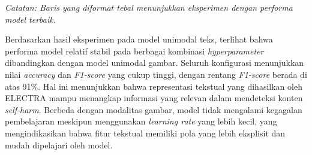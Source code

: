 \begin{table}[H]
    \centering
    \caption{Hasil Eksperimen Model unimodal Teks}
    \label{table:4.teks_eksperimenteks}
    \scriptsize
    \setlength{\tabcolsep}{2pt} 
    \renewcommand{\arraystretch}{1.1}
    \smallskip
    \begin{flushleft}
    \footnotesize \textit{Catatan: Baris yang diformat tebal menunjukkan eksperimen dengan performa model terbaik.}
    \end{flushleft}
\end{table}


Berdasarkan hasil eksperimen pada model unimodal teks, terlihat bahwa performa model relatif stabil pada berbagai kombinasi \textit{hyperparameter} dibandingkan dengan model unimodal gambar. Seluruh konfigurasi menunjukkan nilai \textit{accuracy} dan \textit{F1-score} yang cukup tinggi, dengan rentang \textit{F1-score} berada di atas 91\%. Hal ini menunjukkan bahwa representasi tekstual yang dihasilkan oleh ELECTRA mampu menangkap informasi yang relevan dalam mendeteksi konten \textit{self-harm}. Berbeda dengan modalitas gambar, model tidak mengalami kegagalan pembelajaran meskipun menggunakan \textit{learning rate} yang lebih kecil, yang mengindikasikan bahwa fitur tekstual memiliki pola yang lebih eksplisit dan mudah dipelajari oleh model.


